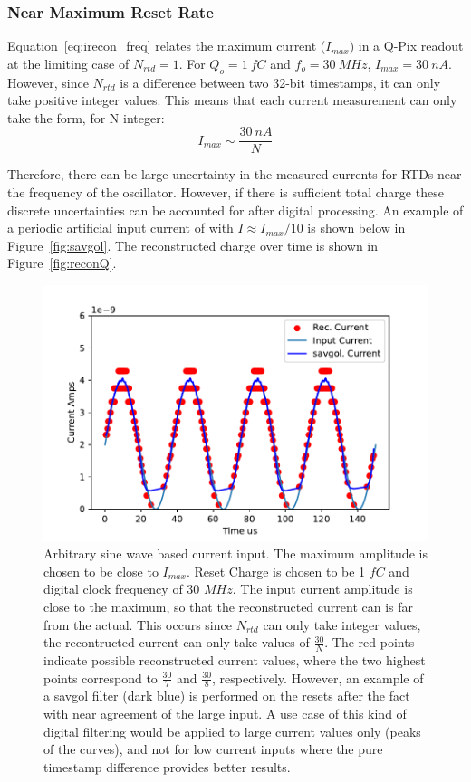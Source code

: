 \subsubsection{Near Maximum Reset Rate}

Equation~\ref{eq:irecon_freq} relates the maximum current ($I_{max}$) in a Q-Pix readout at the limiting case of $N_{rtd} = 1$.
For $Q_{o} = 1~\unit{fC}$ and $f_{o} = 30~\unit{MHz}$, $I_{max} = 30~\unit{nA}$.
However, since $N_{rtd}$ is a difference between two 32-bit timestamps, it can only take positive integer values.
This means that each current measurement can only take the form, for N integer: 
$$
I_{max} \sim \frac{30~\unit{nA}}{N}
$$

Therefore, there can be large uncertainty in the measured currents for RTDs near the frequency of the oscillator.
However, if there is sufficient total charge these discrete uncertainties can be accounted for after digital processing.
An example of a periodic artificial input current of with $I \approx I_{max}/10$ is shown below in Figure~\ref{fig:savgol}.
The reconstructed charge over time is shown in Figure~\ref{fig:reconQ}.

\begin{figure}[]
\centering
\includegraphics[width=\textwidth]{images/savgol.pdf}
\caption{Arbitrary sine wave based current input.
The maximum amplitude is chosen to be close to $I_{max}$.
Reset Charge is chosen to be 1 $\unit{fC}$ and digital clock frequency of 30 $\unit{MHz}$.
The input current amplitude is close to the maximum, so that the reconstructed current can is far from the actual.
This occurs since $N_{rtd}$ can only take integer values, the recontructed current can only take values of $\frac{30}{N}$.
The red points indicate possible reconstructed current values, where the two highest points correspond to $\frac{30}{7}$ and $\frac{30}{8}$, respectively.
However, an example of a savgol filter (dark blue) is performed on the resets after the fact with near agreement of the large input.
A use case of this kind of digital filtering would be applied to large current values only (peaks of the curves), and not for low current inputs where the pure timestamp difference provides better results.}
\end{figure}~\label{fig:savgol}

